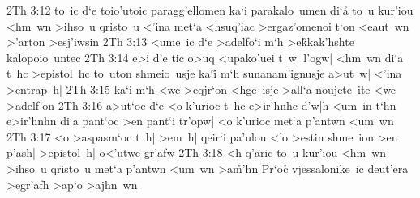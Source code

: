 \vs 2Th 3:12
to~ic
d`e
toio'utoic
paragg'ellomen
ka`i
parakalo~umen
di`a\r{}
to~u
kur'iou
<hm~wn
>ihso~u
qristo~u
<'ina
met`a
<hsuq'iac
>ergaz'omenoi
t`on
<eaut~wn
>'arton
>esj'iwsin\bibvsend
\vs 2Th 3:13
<ume~ic
d`e
>adelfo`i
m`h
>e\r{k}kak'hshte
kalopoio~untec\bibvsend
\vs 2Th 3:14
e>i
d'e
tic
o>uq
<upako'uei
t~w|
l'ogw|
<hm~wn
di`a
t~hc
>epistol~hc
to~uton
shmeio~usje
ka`i\r{}
m`h
sunanam'ignusje
a>ut~w|
<'ina
>entrap~h|\bibvsend
\vs 2Th 3:15
ka`i
m`h
<wc
>eqjr`on
<hge~isje
>all`a
noujete~ite
<wc
>adelf'on\bibvsend
\vs 2Th 3:16
a>ut`oc
d`e
<o
k'urioc
t~hc
e>ir'hnhc
d'w|h
<um~in
t`hn
e>ir'hnhn
di`a
pant`oc
>en
pant`i
tr'opw|
<o
k'urioc
met`a
p'antwn
<um~wn\bibvsend
\vs 2Th 3:17
<o
>aspasm`oc
t~h|
>em~h|
qeir`i
pa'ulou
<'o
>estin
shme~ion
>en
p'ash|
>epistol~h|
o<'utwc
gr'afw\bibvsend
\vs 2Th 3:18
<h
q'aric
to~u
kur'iou
<hm~wn
>ihso~u
qristo~u
met`a
p'antwn
<um~wn
>a\r{m}'hn\bibvsend
{}
Pr`oc\r{}
vjessalonike~ic
deut'era
>egr'afh
>ap`o
>ajhn~wn\bibvsend
